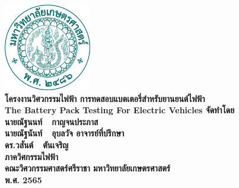 \makeatletter
\clearpage\pagestyle{empty}
	{\centering
	\fontsize{16}{18.4}\selectfont
		\includegraphics[width=1.5in]{KULOGO/kulogo}\\\vspace{\baselineskip}
		\bfseries{โครงงานวิศวกรรมไฟฟ้า}
		\textbf{การทดสอบแบตเตอรี่สำหรับยานยนต์ไฟฟ้า}\\
		\textbf{The Battery Pack Testing For Electric Vehicles}
	\vfill
	\textbf{จัดทำโดย}\\
	\textbf{นายณัฐนนท์\ \ กาญจนประภาส}\\
	\textbf{นายณัฐนันท์\ \ อุบลวัจ}
	\vfill
	\vfill
	\textbf{อาจารย์ที่ปรึกษา}\\
	\textbf{ดร.วสันต์\ \ ตันเจริญ}\\
	\vfill
	\textbf{ภาควิศกรรมไฟฟ้า}
	\vspace{0.15in}
	\textbf{\\คณะวิศวกรรมศาสตร์ศรีราชา มหาวิทยาลัยเกษตรศาสตร์\\ พ.ศ. 2565}
	\par}


\cleardoublepage
\newpage

